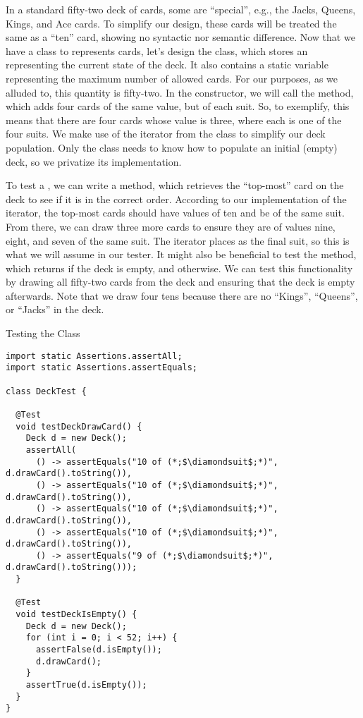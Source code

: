 In a standard fifty-two deck of cards, some are ``special'', e.g., the Jacks, Queens, Kings, and Ace cards. To simplify our design, these cards will be treated the same as a ``ten'' card, showing no syntactic nor semantic difference. Now that we have a class to represents cards, let's design the  class, which stores an  representing the current state of the deck. It also contains a static variable representing the maximum number of allowed cards. For our purposes, as we alluded to, this quantity is fifty-two. In the  constructor, we will call the  method, which adds four cards of the same value, but of each suit. So, to exemplify, this means that there are four cards whose value is three, where each is one of the four suits. We make use of the iterator from the  class to simplify our deck population. Only the  class needs to know how to populate an initial (empty) deck, so we privatize its implementation.

To test a , we can write a  method, which retrieves the ``top-most'' card on the deck to see if it is in the correct order. According to our implementation of the iterator, the top-most cards should have values of ten and be of the same suit. From there, we can draw three more cards to ensure they are of values nine, eight, and seven of the same suit. The iterator places  as the final suit, so this is what we will assume in our tester. It might also be beneficial to test the  method, which returns  if the deck is empty, and  otherwise. We can test this functionality by drawing all fifty-two cards from the deck and ensuring that the deck is empty afterwards. Note that we draw four tens because there are no ``Kings'', ``Queens'', or ``Jacks'' in the deck.

\begin{cl}[]{Testing the  Class}
\begin{lstlisting}[language=MyJava]
import static Assertions.assertAll;
import static Assertions.assertEquals;

class DeckTest {

  @Test
  void testDeckDrawCard() {
    Deck d = new Deck();
    assertAll(
      () -> assertEquals("10 of (*;$\diamondsuit$;*)", d.drawCard().toString()),
      () -> assertEquals("10 of (*;$\diamondsuit$;*)", d.drawCard().toString()),
      () -> assertEquals("10 of (*;$\diamondsuit$;*)", d.drawCard().toString()),
      () -> assertEquals("10 of (*;$\diamondsuit$;*)", d.drawCard().toString()),
      () -> assertEquals("9 of (*;$\diamondsuit$;*)", d.drawCard().toString()));
  }

  @Test
  void testDeckIsEmpty() {
    Deck d = new Deck();
    for (int i = 0; i < 52; i++) {
      assertFalse(d.isEmpty());
      d.drawCard();
    }
    assertTrue(d.isEmpty());
  }
}
\end{lstlisting}
\end{cl}

